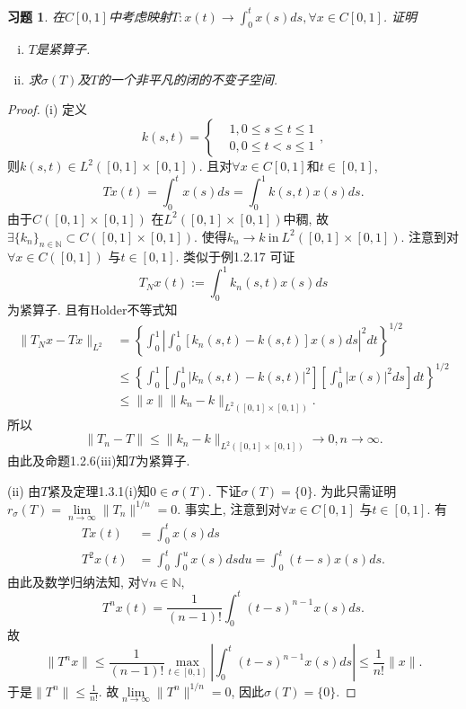 \documentclass[UTF8,twoside]{ctexbook}
\newtheorem{exercise}{习题}[section]
\newcommand{\kx}{\mathbb}
\numberwithin{equation}{section}
\begin{document}
	\begin{exercise}
		在$C[0,1]$中考虑映射$T:x(t)\rightarrow\int_0^t x(s)ds, \forall x\in C[0,1]$. 证明
		\begin{enumerate}[(i)]
			\item $T$是紧算子.
			\item 求$\sigma(T)$及$T$的一个非平凡的闭的不变子空间.
		\end{enumerate}
	\end{exercise}
	\begin{proof}
		(i) 定义
		\[
		k(s,t)=\left\{
		\begin{aligned}
		&1,0\leq s\leq t\leq 1\\
		&0, 0\leq t< s\leq 1
		\end{aligned}
		\right., \]
		则$k(s,t)\in L^2([0,1]\times[0,1])$. 且对$\forall x\in C[0,1]$和$t\in [0,1]$,
		\[
		Tx(t)=\int_0^t x(s)ds=\int_0^1 k(s,t)x(s)ds.
		\]
		由于$C([0,1]\times[0,1])$ 在$L^2([0,1]\times[0,1])$中稠, 故$\exists \{k_n\}_{n\in\kx N}\subset C([0,1]\times[0,1])$. 使得$k_n\rightarrow k \ \text{in}\ L^2([0,1]\times[0,1])$. 注意到对$\forall x\in C([0,1])$ 与$t\in [0,1]$. 类似于例1.2.17 可证
		\[
		T_Nx(t):=\int_0^1 k_n(s,t)x(s)ds
		\]
		为紧算子. 且有Holder不等式知
		\[
		\begin{aligned}
		\|T_Nx-Tx\|_{L^2}
		&=\left\{\int_0^1\left|\int_0^1[k_n(s,t)-k(s,t)]x(s)ds\right|^2dt\right\}^{1/2}\\
		&\leq\left\{\int_0^1\left[\int_0^1|k_n(s,t)-k(s,t)|^2\right]
		\left[\int_0^1|x(s)|^2ds\right]dt
		\right\}^{1/2}\\
		&\leq \|x\|\|k_n-k\|_{L^2([0,1]\times[0,1])}.
		\end{aligned}
		\]
		所以
		\[
		\|T_n-T\|\leq \|k_n-k\|_{L^2([0,1]\times[0,1])}\rightarrow 0,n\rightarrow\infty.
		\]
		由此及命题1.2.6(iii)知$T$为紧算子.

		(ii) 由$T$紧及定理1.3.1(i)知$0\in\sigma(T)$. 下证$\sigma(T)=\{0\}$. 为此只需证明$r_\sigma(T)=\lim\limits_{n\rightarrow\infty}\|T_n\|^{1/n}=0$. 事实上, 注意到对$\forall x\in C[0,1]$ 与$t\in [0,1]$. 有
		\[
		\begin{aligned}
		Tx(t)&=\int_0^t x(s)ds\\
		T^2x(t)&=\int_0^t\int_0^u x(s)dsdu=\int_0^t(t-s)x(s)ds.
		\end{aligned}
		\]
		由此及数学归纳法知, 对$\forall n\in\kx N$,
		\[
		T^n x(t)=\frac{1}{(n-1)!}\int_0^t(t-s)^{n-1}x(s)ds.
		\]
		故
		\[
		\|T^nx\|\leq\frac{1}{(n-1)!}\max_{t\in [0,1]}\left|\int_0^t(t-s)^{n-1}x(s)ds\right|\leq\frac{1}{n!}\|x\|.
		\]
		于是$\|T^n\|\leq\frac{1}{n!}$. 故$\lim\limits_{n\rightarrow\infty}\|T^n\|^{1/n}=0$, 因此$\sigma(T)=\{0\}$.


\end{proof}
\end{document}
